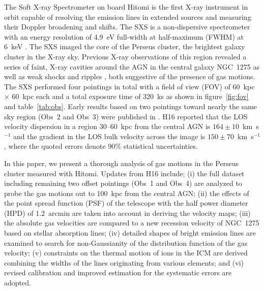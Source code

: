 The Soft X-ray Spectrometer \citep[SXS;][]{Kelley16} on board Hitomi \citep{Takahashi16} is the first X-ray instrument in orbit capable of resolving the emission lines in extended sources and measuring their Doppler broadening and shifts. The SXS is a non-dispersive spectrometer with an energy resolution of 4.9~eV full-width at half-maximum (FWHM) at 6~keV \citep{porter16}. The SXS imaged the core of the Perseus cluster, the brightest galaxy cluster in the X-ray sky. Previous X-ray observations of this region revealed a series of faint, X-ray cavities around the AGN in the central galaxy NGC~1275 \citep{Boehringer93,McNamara96,Churazov00,Fabian00} as well as weak shocks and ripples \citep{Fabian03,Fabian06,Fabian11,Sanders07}, both suggestive of the presence of gas motions. The SXS performed four pointings in total with a field of view (FOV) of 60~kpc $\times$ 60~kpc each and a total exposure time of 320~ks as shown in figure~\ref{fig:fov} and table~\ref{tab:obs}. Early results based on two pointings toward nearly the same sky region (Obs~2 and Obs~3) were published in \citet[][hereafter H16]{hitomi16}. H16 reported that the LOS velocity dispersion in a region 30--60~kpc from the central AGN is $164 \pm 10$~km~s$^{-1}$ and the gradient in the LOS bulk velocity across the image is $150 \pm 70$~km~s$^{-1}$, where the quoted errors denote 90\% statistical uncertainties.

In this paper, we present a thorough analysis of gas motions in the Perseus cluster measured with Hitomi. Updates from H16 include; (i) the full dataset including remaining two offset pointings (Obs~1 and Obs~4) are analyzed to probe the gas motions out to 100~kpc from the central AGN; (ii) the effects of the point spread function (PSF) of the telescope with the half power diameter (HPD) of 1.2~arcmin \citep{okajima16} are taken into account in deriving the velocity maps; (iii) the absolute gas velocities are compared to a new recession velocity of NGC~1275 based on stellar absorption lines; (iv) detailed shapes of bright emission lines are examined to search for non-Gaussianity of the distribution function of the gas velocity; (v) constraints on the thermal motion of ions in the ICM are derived combining the widths of the lines originating from various elements; and (vi) revised calibration and improved estimation for the systematic errors \citep{eckart17} are adopted.

